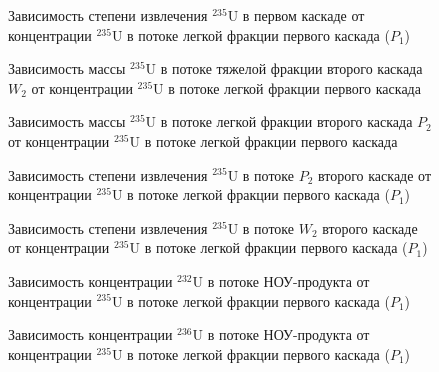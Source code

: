 \begin{figure}[ht]
    \centering
      
    \caption{Зависимость степени извлечения $^{235}$U в первом каскаде от концентрации $^{235}$U в потоке легкой фракции первого каскада ($P_1$)}\label{ex1P1}
\end{figure}

\begin{figure}[ht]
    \centering
    \begin{minipage}{.5\textwidth}
      \centering
      
\caption{{Зависимость массы $^{235}$U в потоке тяжелой фракции второго каскада $W_2$ от концентрации $^{235}$U в потоке легкой фракции первого каскада{\label{M235W2}}}}
    \end{minipage}%
    \begin{minipage}{.5\textwidth}
      \centering
      
\caption{{Зависимость массы $^{235}$U в потоке легкой фракции второго каскада $P_2$ от концентрации $^{235}$U в потоке легкой фракции первого каскада{\label{M235P2}}}}
\end{minipage}
\end{figure}

\begin{figure}[ht]
    \centering
    \begin{minipage}{.5\textwidth}
        \centering
        
  \caption{{Зависимость степени извлечения $^{235}$U в потоке $P_2$ второго каскаде от концентрации $^{235}$U в потоке легкой фракции первого каскада ($P_1$){\label{EX_P2}}}}
  \end{minipage}%
    \begin{minipage}{.5\textwidth}
      \centering
      
\caption{{Зависимость степени извлечения $^{235}$U в потоке $W_2$ второго каскаде от концентрации $^{235}$U в потоке легкой фракции первого каскада ($P_1$){\label{EX_W2}}}}
    \end{minipage}
\end{figure}



\begin{figure}[ht]
  \centering
  \begin{minipage}{.5\textwidth}
    \centering
    
    \caption{{Зависимость концентрации $^{232}$U в потоке НОУ-продукта от концентрации $^{235}$U в потоке легкой фракции первого каскада ($P_1$){\label{C232P}}}}
  \end{minipage}%
  \begin{minipage}{.5\textwidth}
    \centering
    
    \caption{{Зависимость концентрации $^{236}$U в потоке НОУ-продукта от концентрации $^{235}$U в потоке легкой фракции первого каскада ($P_1$){\label{C236P}}}}
\end{minipage}
\end{figure}




